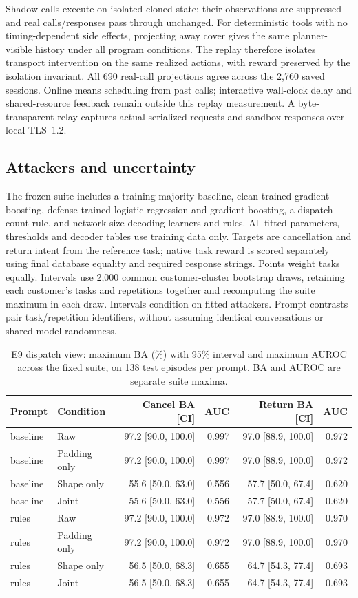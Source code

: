 Shadow calls execute on isolated cloned state; their observations are suppressed and real calls/responses pass through unchanged. For deterministic tools with no timing-dependent side effects, projecting away cover gives the same planner-visible history under all program conditions. The replay therefore isolates transport intervention on the same realized actions, with reward preserved by the isolation invariant. All 690 real-call projections agree across the 2,760 saved sessions. Online means scheduling from past calls; interactive wall-clock delay and shared-resource feedback remain outside this replay measurement. A byte-transparent relay captures actual serialized requests and sandbox responses over local TLS~1.2.

\subsection{Attackers and uncertainty}
The frozen suite includes a training-majority baseline, clean-trained gradient boosting, defense-trained logistic regression and gradient boosting, a dispatch count rule, and network size-decoding learners and rules. All fitted parameters, thresholds and decoder tables use training data only. Targets are cancellation and return intent from the reference task; native task reward is scored separately using final database equality and required response strings. Points weight tasks equally. Intervals use 2,000 common customer-cluster bootstrap draws, retaining each customer's tasks and repetitions together and recomputing the suite maximum in each draw. Intervals condition on fitted attackers. Prompt contrasts pair task/repetition identifiers, without assuming identical conversations or shared model randomness.


\begin{table}[ht]\centering\small
\caption{E9 dispatch view: maximum BA (\%) with 95\% interval and maximum AUROC across the fixed suite, on 138 test episodes per prompt. BA and AUROC are separate suite maxima.}
\begin{tabular}{@{}llrrrr@{}}\toprule
Prompt & Condition & Cancel BA [CI] & AUC & Return BA [CI] & AUC\\\midrule
baseline & Raw & 97.2 [90.0, 100.0] & 0.997 & 97.0 [88.9, 100.0] & 0.972\\
baseline & Padding only & 97.2 [90.0, 100.0] & 0.997 & 97.0 [88.9, 100.0] & 0.972\\
baseline & Shape only & 55.6 [50.0, 63.0] & 0.556 & 57.7 [50.0, 67.4] & 0.620\\
baseline & Joint & 55.6 [50.0, 63.0] & 0.556 & 57.7 [50.0, 67.4] & 0.620\\
rules & Raw & 97.2 [90.0, 100.0] & 0.972 & 97.0 [88.9, 100.0] & 0.970\\
rules & Padding only & 97.2 [90.0, 100.0] & 0.972 & 97.0 [88.9, 100.0] & 0.970\\
rules & Shape only & 56.5 [50.0, 68.3] & 0.655 & 64.7 [54.3, 77.4] & 0.693\\
rules & Joint & 56.5 [50.0, 68.3] & 0.655 & 64.7 [54.3, 77.4] & 0.693\\
\bottomrule\end{tabular}\end{table}

